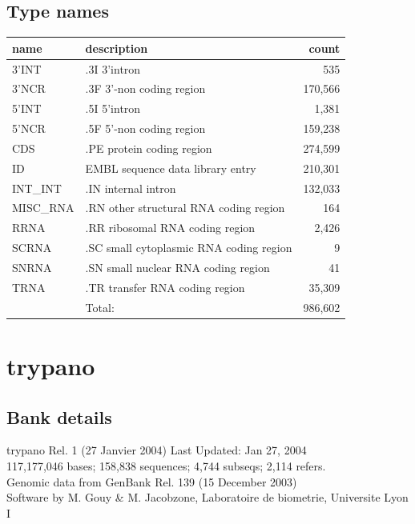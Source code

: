\documentclass{article}
\begin{document}
\begin{Schunk}
\subsection{Type names}
\noindent\begin{tabular}{llr}
\hline \hline
name & description & count \\
\hline
3'INT  &  .3I 3'intron  &  535 \\
3'NCR  &  .3F  3'-non coding region  &  170,566 \\
5'INT  &  .5I 5'intron  &  1,381 \\
5'NCR  &  .5F  5'-non coding region  &  159,238 \\
CDS  &  .PE protein coding region  &  274,599 \\
ID  &  EMBL sequence data library entry  &  210,301 \\
INT\_INT  &  .IN  internal intron  &  132,033 \\
MISC\_RNA  &  .RN other structural RNA coding region  &  164 \\
RRNA  &  .RR ribosomal RNA coding region  &  2,426 \\
SCRNA  &  .SC small cytoplasmic RNA coding region  &  9 \\
SNRNA  &  .SN small nuclear RNA coding region  &  41 \\
TRNA  &  .TR transfer RNA coding region  &  35,309 \\
\hline
 & Total: & 986,602 \\
\hline \hline
\end{tabular}

\section{ trypano }
\subsection{Bank details}
trypano Rel. 1 (27 Janvier 2004) Last Updated: Jan 27, 2004\\
117,177,046 bases; 158,838 sequences; 4,744 subseqs; 2,114 refers.\\
Genomic data from GenBank Rel. 139 (15 December 2003)\\
Software by M. Gouy \& M. Jacobzone, Laboratoire de biometrie, Universite Lyon I


\end{Schunk}
\end{document}
